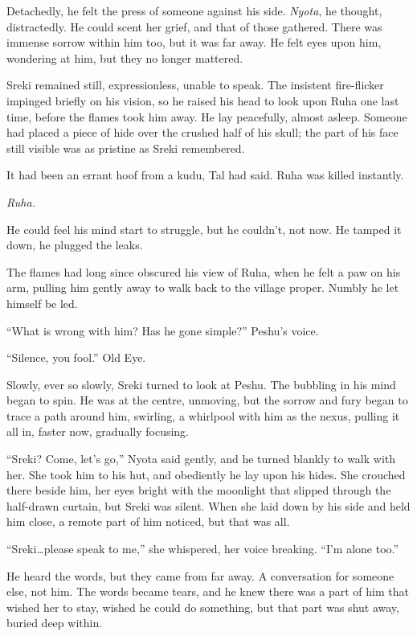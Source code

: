 Detachedly, he felt the press of someone against his side. \emph{Nyota}, he thought, distractedly. He could scent her grief, and that of those gathered. There was immense sorrow within him too, but it was far away. He felt eyes upon him, wondering at him, but they no longer mattered.

Sreki remained still, expressionless, unable to speak. The insistent fire-flicker impinged briefly on his vision, so he raised his head to look upon Ruha one last time, before the flames took him away. He lay peacefully, almost asleep. Someone had placed a piece of hide over the crushed half of his skull; the part of his face still visible was as pristine as Sreki remembered.

It had been an errant hoof from a kudu, Tal had said. Ruha was killed instantly.

\emph{Ruha.}

He could feel his mind start to struggle, but he couldn't, not now. He tamped it down, he plugged the leaks.

The flames had long since obscured his view of Ruha, when he felt a paw on his arm, pulling him gently away to walk back to the village proper. Numbly he let himself be led.

``What is wrong with him? Has he gone simple?'' Peshu's voice.

``Silence, you fool.'' Old Eye.

Slowly, ever so slowly, Sreki turned to look at Peshu. The bubbling in his mind began to spin. He was at the centre, unmoving, but the sorrow and fury began to trace a path around him, swirling, a whirlpool with him as the nexus, pulling it all in, faster now, gradually focusing.

``Sreki? Come, let's go,'' Nyota said gently, and he turned blankly to walk with her. She took him to his hut, and obediently he lay upon his hides. She crouched there beside him, her eyes bright with the moonlight that slipped through the half-drawn curtain, but Sreki was silent. When she laid down by his side and held him close, a remote part of him noticed, but that was all.

``Sreki\ldots{}please speak to me,'' she whispered, her voice breaking. ``I'm alone too.''

He heard the words, but they came from far away. A conversation for someone else, not him. The words became tears, and he knew there was a part of him that wished her to stay, wished he could do something, but that part was shut away, buried deep within.

